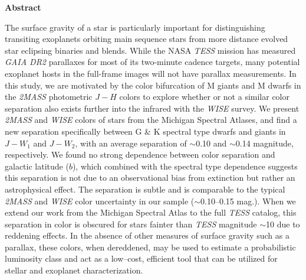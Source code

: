 {}
\vspace*{\fill}
\begin{center}
\textbf{Abstract}

The surface gravity of a star is particularly important for distinguishing transiting exoplanets orbiting main sequence stars from more distance evolved star eclipsing binaries and blends. While the NASA \textit{TESS} mission has measured \textit{GAIA DR2} parallaxes for most of its two-minute cadence targets, many potential exoplanet hosts in the full-frame images will not have parallax measurements. In this study, we are motivated by the color bifurcation of M giants and M dwarfs in the \textit{2MASS} photometric $J-H$ colors to explore whether or not a similar color separation also exists further into the infrared with the \textit{WISE} survey. We present \textit{2MASS} and \textit{WISE} colors of \bincount stars from the Michigan Spectral Atlases, and find a new separation specifically between G \& K spectral type dwarfs and giants in $J-W_{1}$ and $J-W_{2}$, with an average separation of $\sim$0.10 and $\sim$0.14 magnitude, respectively. We found no strong dependence between color separation and galactic latitude ($b$), which combined with the spectral type dependence suggests this separation is not due to an observational bias from extinction but rather an astrophysical effect. The separation is subtle and is comparable to the typical \textit{2MASS} and \textit{WISE} color uncertainty in our sample ($\sim$0.10--0.15 mag.). When we extend our work from the Michigan Spectral Atlas to the full \textit{TESS} catalog, this separation in color is obscured for stars fainter than \textit{TESS} magnitude $\sim$10 due to reddening effects. In the absence of other measures of surface gravity such as a parallax, these colors, when dereddened, may be used to estimate a probabilistic luminosity class and act as a low--cost, efficient tool that can be utilized for stellar and exoplanet characterization.

\end{center}
\vspace{\fill}
